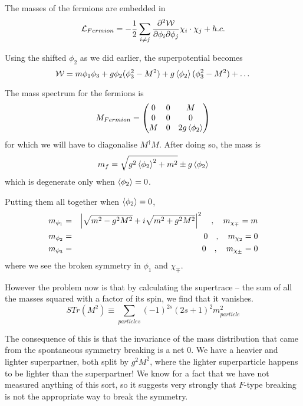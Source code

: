 The masses of the fermions are embedded in 
\begin{equation}
    \mathcal{L}_{Fermion} = -\frac{1}{2} \sum_{i \neq j} \frac{\partial {^2 \mathcal{W}}}{\partial {\phi_i \partial \phi_j}} \chi_i\cdot\chi_j + h.c.
\end{equation}

Using the shifted $\phi_2$ as we did earlier, the superpotential becomes
\begin{equation}
    \mathcal{W} = m\phi_1 \phi_3 + g\phi_2(\phi_3^2 - M^2) + g\braket{\phi_2} (\phi_3^2 - M^2) + \dots
\end{equation}

The mass spectrum for the fermions is
\begin{equation}
    M_{Fermion} =
    \begin{pmatrix}
        0 & 0 & M \\ 0 & 0 & 0 \\ M & 0 & 2g\braket{\phi_2}
    \end{pmatrix}
\end{equation}
for which we will have to diagonalise $M^\dagger M$. After doing so, the mass is
\begin{equation}
    m_f = \sqrt{g^2 \braket{\phi_2}^2 + m^2} \pm g \braket{\phi_2}
\end{equation}
which is degenerate only when $\braket{\phi_2} = 0$.

Putting them all together when $\braket{\phi_2} = 0$,
\begin{eqnarray}
    m_{\phi_1} &=& \left\vert \sqrt{m^2 - g^2 M^2} + i \sqrt{m^2 + g^2 M^2} \right\vert^2 \quad , \quad m_{\chi_\mp} = m \nonumber \\
    m_{\phi_2} &=& 0 \quad , \quad m_{\chi_2} = 0 \nonumber \\
    m_{\phi_3} &=& 0 \quad , \quad m_{\chi_\pm} = 0
\end{eqnarray}
where we see the broken symmetry in $\phi_1$ and $\chi_\mp$.

However the problem now is that by calculating the supertrace -- the sum of all the masses squared with a factor of its spin, we find that it vanishes.
\begin{equation}
    STr(M^2) \equiv \sum_{particles} (-1)^{2s} (2s + 1)^2 m^2_{particle}
\end{equation}

The consequence of this is that the invariance of the mass distribution that came from the spontaneous symmetry breaking is a net $0$. We have a heavier and lighter superpartner, both split by $g^2 M^2$, where the lighter superparticle happens to be lighter than the superpartner! We know for a fact that we have not measured anything of this sort, so it suggests very strongly that $F$-type breaking is not the appropriate way to break the symmetry.

